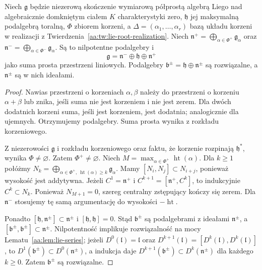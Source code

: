 \begin{twierdzenie}
\label{aa:tw:lie-triangular-decomposition}
Niech $\mathfrak g$ będzie niezerową skończenie wymiarową półprostą algebrą Liego nad algebraicznie domkniętym ciałem $K$ charakterystyki zero, $\mathfrak h$ jej maksymalną podalgebrą toralną, $\Phi$ zbiorem korzeni, a $\Delta=(\alpha_1,\ldots,\alpha_r)$ bazą układu korzeni w realizacji z Twierdzenia~\ref{aa:tw:lie-root-realization}. Niech $\mathfrak n^+=\bigoplus_{\alpha\in\Phi^+}\mathfrak g_\alpha$ oraz $\mathfrak n^-=\bigoplus_{\alpha\in\Phi^-}\mathfrak g_\alpha$. Są to nilpotentne podalgebry i
\[
 \mathfrak g=\mathfrak n^-\oplus\mathfrak h\oplus\mathfrak n^+
\]
jako suma prosta przestrzeni liniowych. Podalgebry $\mathfrak b^\pm=\mathfrak h\oplus\mathfrak n^\pm$ są rozwiązalne, a $\mathfrak n^\pm$ są w nich ideałami.
\end{twierdzenie}
\begin{proof}
Nawias przestrzeni o korzeniach $\alpha,\beta$ należy do przestrzeni o korzeniu $\alpha+\beta$ lub znika, jeśli suma nie jest korzeniem i nie jest zerem. Dla dwóch dodatnich korzeni suma, jeśli jest korzeniem, jest dodatnia; analogicznie dla ujemnych. Otrzymujemy podalgebry. Suma prosta wynika z rozkładu korzeniowego.

Z niezerowości $\mathfrak g$ i rozkładu korzeniowego oraz faktu, że korzenie rozpinają $\mathfrak h^*$, wynika $\Phi\ne\varnothing$. Zatem $\Phi^+\ne\varnothing$. Niech $M=\max_{\alpha\in\Phi^+}\operatorname{ht}(\alpha)$. Dla $k\ge1$ połóżmy $N_k=\bigoplus_{\alpha\in\Phi^+,\ \operatorname{ht}(\alpha)\ge k}\mathfrak g_\alpha$. Mamy $[N_i,N_j]\subset N_{i+j}$, ponieważ wysokość jest addytywna. Jeżeli $C^1=\mathfrak n^+$ i $C^{k+1}=[\mathfrak n^+,C^k]$, to indukcyjnie $C^k\subset N_k$. Ponieważ $N_{M+1}=0$, szereg centralny zstępujący kończy się zerem. Dla $\mathfrak n^-$ stosujemy tę samą argumentację do wysokości $-\operatorname{ht}$.

Ponadto $[\mathfrak h,\mathfrak n^\pm]\subset\mathfrak n^\pm$ i $[\mathfrak h,\mathfrak h]=0$. Stąd $\mathfrak b^\pm$ są podalgebrami z ideałami $\mathfrak n^\pm$, a $[\mathfrak b^\pm,\mathfrak b^\pm]\subset\mathfrak n^\pm$. Nilpotentność implikuje rozwiązalność na mocy Lematu~\ref{aa:lem:lie-series}; jeżeli $D^0(\mathfrak l)=\mathfrak l$ oraz $D^{k+1}(\mathfrak l)=[D^k(\mathfrak l),D^k(\mathfrak l)]$, to $D^1(\mathfrak b^\pm)\subset D^0(\mathfrak n^\pm)$, a indukcja daje $D^{k+1}(\mathfrak b^\pm)\subset D^k(\mathfrak n^\pm)$ dla każdego $k\ge0$. Zatem $\mathfrak b^\pm$ są rozwiązalne.
\end{proof}

